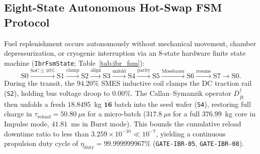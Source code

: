 \documentclass[11pt,onecolumn]{article}
\begin{document}
\begin{table}[!htbp]
\centering\footnotesize
\setlength{\tabcolsep}{4pt}
\caption{\texttt{SHBT-IBR-312} Dark-Sector Anyon Braid Reload Magazine Operating Tiers. Verified by GATE-IBR-03..04.}
\label{tab:magazine_tiers}
\end{table}

\FloatBarrier
\subsection{Eight-State Autonomous Hot-Swap FSM Protocol}
\label{subsec:ibr_fsm}
Fuel replenishment occurs autonomously without mechanical movement, chamber depressurization, or cryogenic interruption via an 8-state hardware finite state machine (\texttt{IbrFsmState}; Table~\ref{tab:ibr_fsm}):
\begin{equation}
  \mathrm{S0} \xrightarrow{\mathrm{SoC} \le 10\%} \mathrm{S1} \xrightarrow{\mathrm{clamp}} \mathrm{S2} \xrightarrow{\mathrm{align}} \mathrm{S3} \xrightarrow{\mathrm{unfold}} \mathrm{S4} \xrightarrow{\mathrm{parity}} \mathrm{S5} \xrightarrow{\mathrm{M\ddot{o}ssbauer}} \mathrm{S6} \xrightarrow{\mathrm{resume}} \mathrm{S7} \to \mathrm{S0}.
  \label{eq:ibr_fsm_chain}
\end{equation}
During the transit, the $94.20\%$ SMES inductive coil clamps the DC traction rail (\texttt{S2}), holding bus voltage droop to $0.00\%$. The Callan--Symanzik operator $D_{\bar B}^\dagger$ then unfolds a fresh $18.8495$~kg $\overline{\mathbf{16}}$ batch into the seed wafer (\texttt{S4}), restoring full charge in $\tau_{\mathrm{reload}} = 50.80~\mu\mathrm{s}$ for a micro-batch ($317.8~\mu\mathrm{s}$ for a full $376.99$~kg core in Impulse mode, $41.81$~ms in Burst mode). This bounds the cumulative reload downtime ratio to less than $3.259\times 10^{-10} \ll 10^{-7}$, yielding a continuous propulsion duty cycle of $\eta_{\mathrm{duty}} = 99.999999967\%$ (\texttt{GATE-IBR-05}, \texttt{GATE-IBR-08}).
\end{document}
